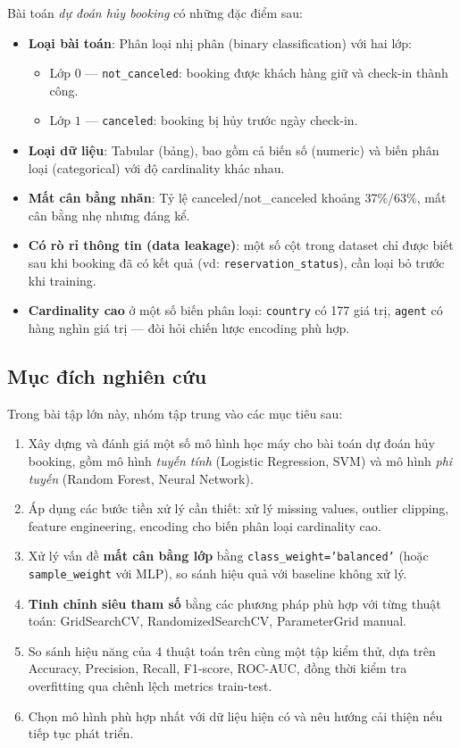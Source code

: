 \documentclass[12pt, a4paper]{article}
\begin{document}
Bài toán \emph{dự đoán hủy booking} có những đặc điểm sau:

\begin{itemize}
    \item \textbf{Loại bài toán}: Phân loại nhị phân (binary classification) với hai lớp:
    \begin{itemize}
        \item Lớp $0$ --- \texttt{not\_canceled}: booking được khách hàng giữ và check-in thành công.
        \item Lớp $1$ --- \texttt{canceled}: booking bị hủy trước ngày check-in.
    \end{itemize}
    \item \textbf{Loại dữ liệu}: Tabular (bảng), bao gồm cả biến số (numeric) và biến phân loại (categorical) với độ cardinality khác nhau.
    \item \textbf{Mất cân bằng nhãn}: Tỷ lệ canceled/not\_canceled khoảng 37\%/63\%, mất cân bằng nhẹ nhưng đáng kể.
    \item \textbf{Có rò rỉ thông tin (data leakage)}: một số cột trong dataset chỉ được biết sau khi booking đã có kết quả (vd: \texttt{reservation\_status}), cần loại bỏ trước khi training.
    \item \textbf{Cardinality cao} ở một số biến phân loại: \texttt{country} có 177 giá trị, \texttt{agent} có hàng nghìn giá trị --- đòi hỏi chiến lược encoding phù hợp.
\end{itemize}

\subsection{Mục đích nghiên cứu}

Trong bài tập lớn này, nhóm tập trung vào các mục tiêu sau:

\begin{enumerate}
    \item Xây dựng và đánh giá một số mô hình học máy cho bài toán dự đoán hủy booking, gồm mô hình \emph{tuyến tính} (Logistic Regression, SVM) và mô hình \emph{phi tuyến} (Random Forest, Neural Network).
    \item Áp dụng các bước tiền xử lý cần thiết: xử lý missing values, outlier clipping, feature engineering, encoding cho biến phân loại cardinality cao.
    \item Xử lý vấn đề \textbf{mất cân bằng lớp} bằng \texttt{class\_weight='balanced'} (hoặc \texttt{sample\_weight} với MLP), so sánh hiệu quả với baseline không xử lý.
    \item \textbf{Tinh chỉnh siêu tham số} bằng các phương pháp phù hợp với từng thuật toán: GridSearchCV, RandomizedSearchCV, ParameterGrid manual.
    \item So sánh hiệu năng của 4 thuật toán trên cùng một tập kiểm thử, dựa trên Accuracy, Precision, Recall, F1-score, ROC-AUC, đồng thời kiểm tra overfitting qua chênh lệch metrics train-test.
    \item Chọn mô hình phù hợp nhất với dữ liệu hiện có và nêu hướng cải thiện nếu tiếp tục phát triển.
\end{enumerate}
\end{document}
